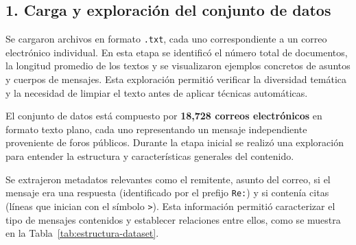 \documentclass[journal]{IEEEtran} %
\begin{document}
\subsection*{1. Carga y exploración del conjunto de datos}
Se cargaron archivos en formato \texttt{.txt}, cada uno correspondiente a un correo electrónico individual. En esta etapa se identificó el número total de documentos, la longitud promedio de los textos y se visualizaron ejemplos concretos de asuntos y cuerpos de mensajes. Esta exploración permitió verificar la diversidad temática y la necesidad de limpiar el texto antes de aplicar técnicas automáticas.

\vspace{12pt}
El conjunto de datos está compuesto por \textbf{18,728 correos electrónicos} en formato texto plano, cada uno representando un mensaje independiente proveniente de foros públicos. Durante la etapa inicial se realizó una exploración para entender la estructura y características generales del contenido.

\vspace{12pt}
Se extrajeron metadatos relevantes como el remitente, asunto del correo, si el mensaje era una respuesta (identificado por el prefijo \texttt{Re:}) y si contenía citas (líneas que inician con el símbolo \texttt{>}). Esta información permitió caracterizar el tipo de mensajes contenidos y establecer relaciones entre ellos, como se muestra en la Tabla~\ref{tab:estructura-dataset}.

\begin{table}[t]
\centering
\caption{Ejemplo de estructura del dataset después del preprocesamiento}
\label{tab:estructura-dataset}
\end{table}
\end{document}

